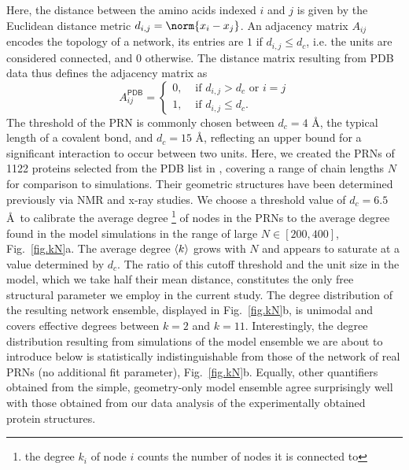 \documentclass[9pt]{elife}
\DeclarePairedDelimiter{\evdel}{\langle}{\rangle}
\begin{document}
Here, the distance between the amino acids indexed $i$ and $j$ is given by the Euclidean distance metric $d_{i,j}=\norm{x_i-x_j}$. An adjacency matrix $A_{ij}$ encodes the topology of a network, its entries are $1$ if $d_{i,j}\leq d_c$, i.e. the units are considered connected, and $0$ otherwise.
The distance matrix resulting from PDB data thus defines the adjacency matrix as
 \begin{equation}
  A^{\textsf{PDB}}_{ij}=
  \begin{cases}
   0, & \text{ if } d_{i,j}>d_c \text{ or } i=j\\
      1, & \text{ if } d_{i,j}\leq d_c .
      \end{cases}
    \label{eq:aij}
  \end{equation}
The threshold of the PRN is commonly chosen between $d_c=4$ \AA, the typical length of a covalent bond, and $d_c=15$ \AA, reflecting an upper bound for a significant interaction to occur between two units. Here, we created the PRNs of 1122 proteins selected from the PDB list in \cite{Hong2013}, covering a range of chain lengths $N$ for comparison to simulations. Their geometric structures have been determined previously via NMR and x-ray studies. We choose a threshold value of $d_c=6.5$ \AA \ to calibrate the average degree \footnote{the degree $k_i$ of node $i$ counts the number of nodes it is connected to} of nodes in the PRNs to the average degree found in the model simulations in the range of large $N\in [200,400]$, Fig.~\ref{fig.kN}a. The average degree $\evdel{k}$ grows with $N$ and appears to saturate at a value determined by $d_c$. The ratio of this cutoff threshold and the unit size in the model, which we take half their mean distance, constitutes the only free structural parameter we employ in the current study. The degree distribution of the resulting network ensemble, displayed in Fig.~\ref{fig.kN}b, is unimodal and covers effective degrees between $k=2$ and $k=11$. Interestingly, the degree distribution resulting from simulations of the model ensemble we are about to introduce below is statistically indistinguishable from those of the network of real PRNs (no additional fit parameter), Fig.~\ref{fig.kN}b. Equally, other quantifiers obtained from the simple, geometry-only model ensemble agree surprisingly well with those obtained from our data analysis of the experimentally obtained protein structures.
\end{document}

